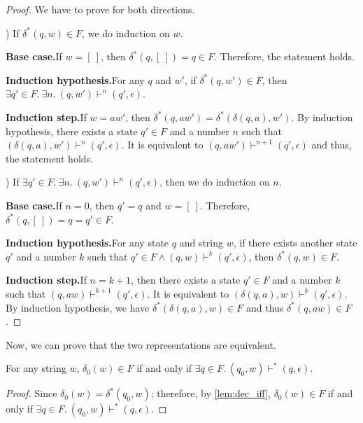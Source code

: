 \begin{proof}
\noindent We have to prove for both directions. 

\par {}) If \(\delta^*(q,w) \in F\), we do induction on \(w\).
\par \textbf{Base case.}\quad If \(w = [\ ]\), then \(\delta^*(q,[\ ]) =
q \in F\). Therefore, the statement holds.
\par \textbf{Induction hypothesis.}\quad For any \(q\) and \(w'\), if
\(\delta^*(q,w') \in F\), then \(\exists q'\in F.\ \exists n.\ (q,w') \vdash^n (q',\epsilon)\).
\par \textbf{Induction step.}\quad If \(w = aw'\), then
\(\delta^*(q,aw') = \delta^*(\delta(q,a),w')\). By induction
hypothesis, there exists a state \(q' \in F\) and a number \(n\) such
that \((\delta(q,a),w') \vdash^n (q',\epsilon)\). It is equivalent to
\((q,aw') \vdash^{n+1} (q',\epsilon)\) and thus, the statement holds.

\par {}) If \(\exists q'\in F.\ \exists n.\ (q,w') \vdash^n
(q',\epsilon)\), then we do induction on \(n\).
\par \textbf{Base case.}\quad If \(n = 0\), then \(q' = q\) and \(w =
[\ ]\). Therefore, \(\delta^*(q,[\ ]) = q = q' \in F\). 
\par \textbf{Induction hypothesis.}\quad For any state \(q\) and
string \(w\), if
there exists another state \(q'\) and a number \(k\) such that \(q' \in F \wedge (q,w) \vdash^k
(q',\epsilon)\), then \(\delta^*(q,w) \in F\). 
\par \textbf{Induction step.}\quad If \(n = k + 1\), then there
exists a state \(q' \in F\) and a number \(k\) such that \((q,aw) \vdash^{k+1}
(q',\epsilon)\). It is equivalent to \((\delta(q,a),w) \vdash^k
(q',\epsilon)\). By induction hypothesis, we have
\(\delta^*(\delta(q,a),w) \in F\) and thus \(\delta^*(q,aw) \in F\). 
\end{proof} 

\par Now, we can prove that the two representations are equivalent. 

\begin{lem}
\label{lem:dec_iff2}
\noindent For any string
\(w\), \(\delta_0 (w) \in F\) if and only if \(\exists q\in F.\ (q_0,w) \vdash^* (q,\epsilon)\).
\end{lem}

\begin{proof}
\noindent Since \(\delta_0(w) = \delta^*(q_0,w)\); therefore, by
\autoref{lem:dec_iff}, \(\delta_0(w) \in F\) if and only if \(\exists
q\in F.\ (q_0,w) \vdash^* (q,\epsilon)\). 
\end{proof}

